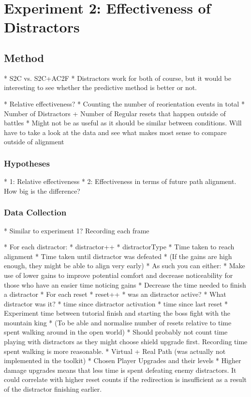 \chapter{Experiment 2: Effectiveness of Distractors}

\section{Method}
* S2C vs. S2C+AC2F
* Distractors work for both of course, but it would be interesting to see whether the predictive method is better or not. 

* Relative effectiveness?
   * Counting the number of reorientation events in total
   * Number of Distractors + Number of Regular resets that happen outside of battles
* Might not be as useful as it should be similar between conditions. Will have to take a look at the data and see what makes most sense to compare outside of alignment


\subsection{Hypotheses}
* 1: Relative effectiveness
* 2: Effectiveness in terms of future path alignment. How big is the difference?

\subsection{Data Collection}
* Similar to experiment 1? Recording each frame

   * For each distractor:
      * distractor++
      * distractorType
      * Time taken to reach alignment
      * Time taken until distractor was defeated
      * (If the gains are high enough, they might be able to align very early)
         * As such you can either: 
            * Make use of lower gains to improve potential comfort and decrease noticeability for those who have an easier time noticing gains
            * Decrease the time needed to finish a distractor
   * For each reset
      * reset++
      * was an distractor active?
         * What distractor was it?
         * time since distractor activation
      * time since last reset
   * Experiment time between tutorial finish and starting the boss fight with the mountain king
      * (To be able and normalise number of resets relative to time spent walking around in the open world)
      * Should probably not count time playing with distractors as they might choose shield upgrade first. Recording time spent walking is more reasonable.
   * Virtual + Real Path (was actually not implemented in the toolkit)
   * Chosen Player Upgrades and their levels
      * Higher damage upgrades means that less time is spent defeating enemy distractors. It could correlate with higher reset counts if the redirection is insufficient as a result of the distractor finishing earlier.

